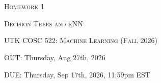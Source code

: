 \documentclass{article}
\begin{document}
\section*{}
\begin{center}
  \centerline{\textsc{\LARGE  Homework 1}}
  \vspace{0.5em}
  \centerline{\textsc{\LARGE Decision Trees and kNN}
  }
  \vspace{1em}
  \textsc{\large UTK COSC 522: Machine Learning (Fall 2026)} \\
  \vspace{0.5em}
  \centerline{OUT: Thursday, Aug 27th, 2026}
  \vspace{0.5em}
  \centerline{DUE: Thursday, Sep 17th, 2026, 11:59pm EST}
\end{center}
\end{document}
